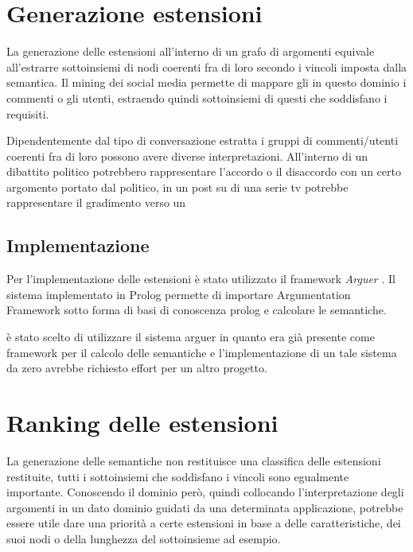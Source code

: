 




\section {Generazione estensioni}
La generazione delle estensioni all'interno di un grafo di argomenti equivale all'estrarre sottoinsiemi di nodi coerenti fra di loro secondo i vincoli imposta dalla semantica. Il mining dei social media permette di mappare gli in questo dominio i commenti o gli utenti, estraendo quindi sottoinsiemi di questi che soddisfano i requisiti. 

Dipendentemente dal tipo di conversazione estratta i gruppi di commenti/utenti coerenti fra di loro possono avere diverse interpretazioni. All'interno di un dibattito politico potrebbero rappresentare l'accordo o il disaccordo con un certo argomento portato dal politico, in un post su di una serie tv potrebbe rappresentare il gradimento verso un 

\subsection {Implementazione}
Per l'implementazione delle estensioni è stato utilizzato il framework \textit{Arguer} \cite{}. Il sistema implementato in Prolog permette di importare Argumentation Framework sotto forma di basi di conoscenza prolog e calcolare le semantiche. 

è stato scelto di utilizzare il sistema arguer in quanto era già presente come framework per il calcolo delle semantiche e l'implementazione di un tale sistema da zero avrebbe richiesto effort per un altro progetto.


\section {Ranking delle estensioni}
La generazione delle semantiche non restituisce una classifica delle estensioni restituite, tutti i sottoinsiemi che soddisfano i vincoli sono egualmente importante. Conoscendo il dominio però, quindi collocando l'interpretazione degli argomenti in un dato dominio guidati da una determinata applicazione, potrebbe essere utile dare una priorità a certe estensioni in base a delle caratteristiche, dei suoi nodi o della lunghezza del sottoinsieme ad esempio. 

